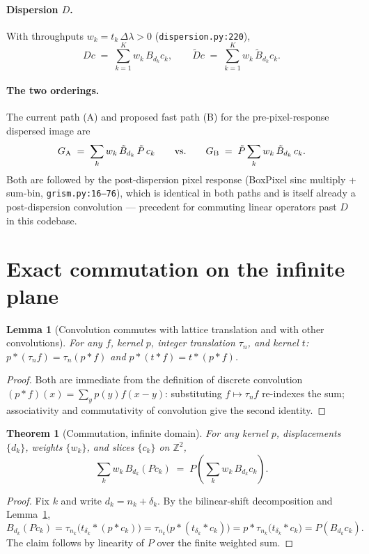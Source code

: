 \documentclass[11pt]{article}
\newtheorem{theorem}{Theorem}
\newtheorem{lemma}{Lemma}
\newcommand{\Z}{\mathbb{Z}}
\newcommand{\conv}{\ast}
\newcommand{\code}[1]{\texttt{#1}}
\begin{document}
\paragraph{Dispersion $D$.} With throughputs $w_k = t_k\,\Delta\lambda > 0$
(\code{dispersion.py:220}),
\[
D c \;=\; \sum_{k=1}^{K} w_k\, B_{d_k} c_k ,
\qquad
\tilde D c \;=\; \sum_{k=1}^{K} w_k\, \tilde B_{d_k} c_k .
\]

\paragraph{The two orderings.} The current path (A) and proposed fast path
(B) for the pre-pixel-response dispersed image are
\[
G_{\rm A} \;=\; \sum_k w_k\, \tilde B_{d_k}\, \tilde P\, c_k
\qquad\text{vs.}\qquad
G_{\rm B} \;=\; \tilde P \sum_k w_k\, \tilde B_{d_k}\, c_k .
\]
Both are followed by the post-dispersion pixel response (BoxPixel sinc
multiply + sum-bin, \code{grism.py:16--76}), which is identical in both paths
and is itself already a post-dispersion convolution --- precedent for
commuting linear operators past $D$ in this codebase.

\section{Exact commutation on the infinite plane}

\begin{lemma}[Convolution commutes with lattice translation and with other
convolutions]
\label{lem:comm}
For any $f$, kernel $p$, integer translation $\tau_n$, and kernel $t$:
$p \conv (\tau_n f) = \tau_n (p \conv f)$ and
$p \conv (t \conv f) = t \conv (p \conv f)$.
\end{lemma}
\begin{proof}
Both are immediate from the definition of discrete convolution
$(p\conv f)(x) = \sum_y p(y) f(x-y)$: substituting $f \mapsto \tau_n f$
re-indexes the sum; associativity and commutativity of convolution give the
second identity.
\end{proof}

\begin{theorem}[Commutation, infinite domain]
\label{thm:main}
For any kernel $p$, displacements $\{d_k\}$, weights $\{w_k\}$, and slices
$\{c_k\}$ on $\Z^2$,
\[
\sum_k w_k\, B_{d_k} (P c_k) \;=\; P\!\left(\sum_k w_k\, B_{d_k} c_k\right).
\]
\end{theorem}
\begin{proof}
Fix $k$ and write $d_k = n_k + \delta_k$. By the bilinear-shift decomposition
and Lemma~\ref{lem:comm},
\[
B_{d_k}(P c_k)
= \tau_{n_k}\big(t_{\delta_k} \conv (p \conv c_k)\big)
= \tau_{n_k}\big(p \conv (t_{\delta_k} \conv c_k)\big)
= p \conv \tau_{n_k}\big(t_{\delta_k} \conv c_k\big)
= P(B_{d_k} c_k).
\]
The claim follows by linearity of $P$ over the finite weighted sum.
\end{proof}
\end{document}
